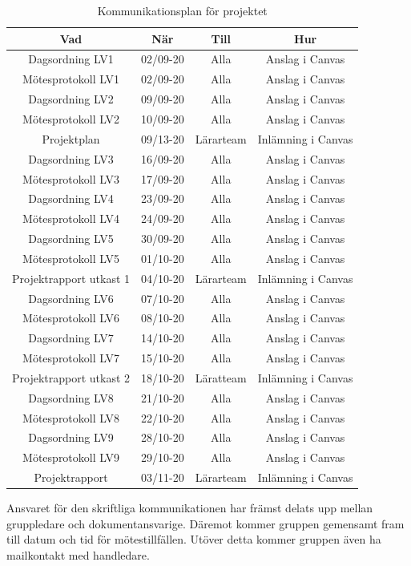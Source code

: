 \documentclass[a4paper]{article}
\begin{document}
\begin{table}[H]
    \centering
    \begin{tabular}{ |c|c|c|c| }\hline
     Vad & När & Till & Hur \\\hline
     Dagsordning LV1 & 02/09-20 & Alla & Anslag i Canvas \\\hline
     Mötesprotokoll LV1 & 02/09-20 & Alla & Anslag i Canvas \\\hline
     Dagsordning LV2 & 09/09-20 & Alla & Anslag i Canvas \\\hline
     Mötesprotokoll LV2 & 10/09-20 & Alla & Anslag i Canvas \\\hline
     Projektplan & 09/13-20 & Lärarteam & Inlämning i Canvas\\\hline
     Dagsordning LV3 & 16/09-20 & Alla & Anslag i Canvas \\\hline
     Mötesprotokoll LV3 & 17/09-20 & Alla & Anslag i Canvas \\\hline
     Dagsordning LV4 & 23/09-20 & Alla & Anslag i Canvas \\\hline
     Mötesprotokoll LV4 & 24/09-20 & Alla & Anslag i Canvas \\\hline
     Dagsordning LV5 & 30/09-20 & Alla & Anslag i Canvas \\\hline
     Mötesprotokoll LV5 & 01/10-20 & Alla & Anslag i Canvas \\\hline
     Projektrapport utkast 1 & 04/10-20 & Lärarteam & Inlämning i Canvas \\\hline
     Dagsordning LV6 & 07/10-20 & Alla & Anslag i Canvas \\\hline
     Mötesprotokoll LV6 & 08/10-20 & Alla & Anslag i Canvas \\\hline
     Dagsordning LV7 & 14/10-20 & Alla & Anslag i Canvas \\\hline
     Mötesprotokoll LV7 & 15/10-20 & Alla & Anslag i Canvas \\\hline
     Projektrapport utkast 2 & 18/10-20 & Läratteam & Inlämning i Canvas \\\hline
     Dagsordning LV8 & 21/10-20 & Alla & Anslag i Canvas \\\hline
     Mötesprotokoll LV8 & 22/10-20 & Alla & Anslag i Canvas \\\hline
     Dagsordning LV9 & 28/10-20 & Alla & Anslag i Canvas \\\hline
     Mötesprotokoll LV9 & 29/10-20 & Alla & Anslag i Canvas \\\hline
     Projektrapport & 03/11-20 & Lärarteam & Inlämning i Canvas \\\hline
    \end{tabular}
    \caption{Kommunikationsplan för projektet}
    \label{table:kommunikationsplan}
\end{table}
Ansvaret för den skriftliga kommunikationen har främst delats upp mellan gruppledare och dokumentansvarige. Däremot kommer gruppen gemensamt fram till datum och tid för mötestillfällen. Utöver detta kommer gruppen även ha mailkontakt med handledare.
\end{document}
